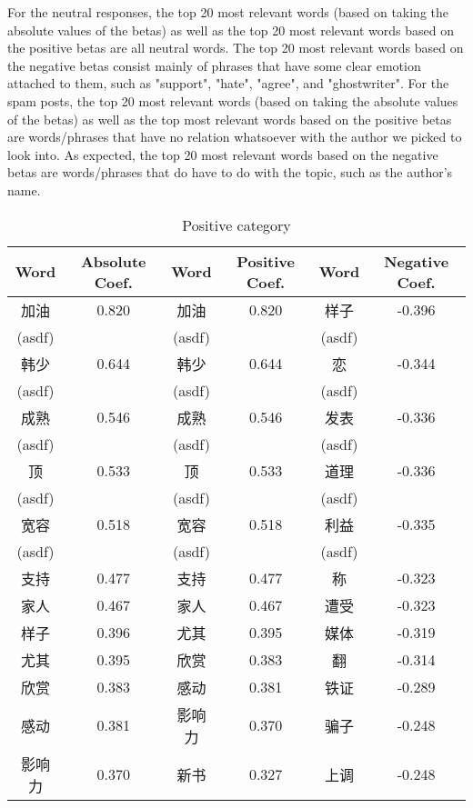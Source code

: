 \documentclass[11pt]{article}
\newcommand{\1}[1]{{\mathbf 1}\left\{#1\right\}}        %
\begin{document}
For the neutral responses, the top 20 most relevant words (based on taking the absolute values of the betas) as well as the top 20 most relevant words based on the positive betas are all neutral words. The top 20 most relevant words based on the negative betas consist mainly of phrases that have some clear emotion attached to them, such as "support", "hate", "agree", and "ghostwriter". For the spam posts, the top 20 most relevant words (based on taking the absolute values of the betas) as well as the top most relevant words based on the positive betas are words/phrases that have no relation whatsoever with the author we picked to look into.  As expected, the top 20 most relevant words based on the negative betas are words/phrases that do have to do with the topic, such as the author's name. 

\begin{table}
\caption{Positive category}
\begin{center}
\begin{tabular}{|c|c||c|c||c|c|}
\hline
Word & Absolute Coef. & Word & Positive Coef. & Word & Negative Coef.\\ \hline \hline
加油 & 0.820 & 加油 & 0.820 & 样子 & -0.396\\
(asdf) & & (asdf) & & (asdf) & \\\hline
韩少 & 0.644 & 韩少 & 0.644 & 恋 & -0.344\\
(asdf) & & (asdf) & & (asdf) & \\\hline
成熟 & 0.546 & 成熟 & 0.546 & 发表 & -0.336\\
(asdf) & & (asdf) & & (asdf) & \\\hline
顶 & 0.533 & 顶 & 0.533 & 道理 & -0.336\\
(asdf) & & (asdf) & & (asdf) & \\\hline
宽容 & 0.518 & 宽容 & 0.518 & 利益 & -0.335\\
(asdf) & & (asdf) & & (asdf) & \\\hline
支持 & 0.477 & 支持 & 0.477 & 称 & -0.323\\ \hline
家人 & 0.467 & 家人 & 0.467 & 遭受 & -0.323\\ \hline
样子 & 0.396 & 尤其 & 0.395 & 媒体 & -0.319\\ \hline
尤其 & 0.395 & 欣赏 & 0.383 & 翻 & -0.314\\ \hline
欣赏 & 0.383 & 感动 & 0.381 & 铁证 & -0.289\\ \hline
感动 & 0.381 & 影响力 & 0.370 & 骗子 & -0.248\\ \hline
影响力 & 0.370 & 新书 & 0.327 & 上调 & -0.248\\ \hline

\end{tabular}
\end{center}
\end{table}
\end{document}
